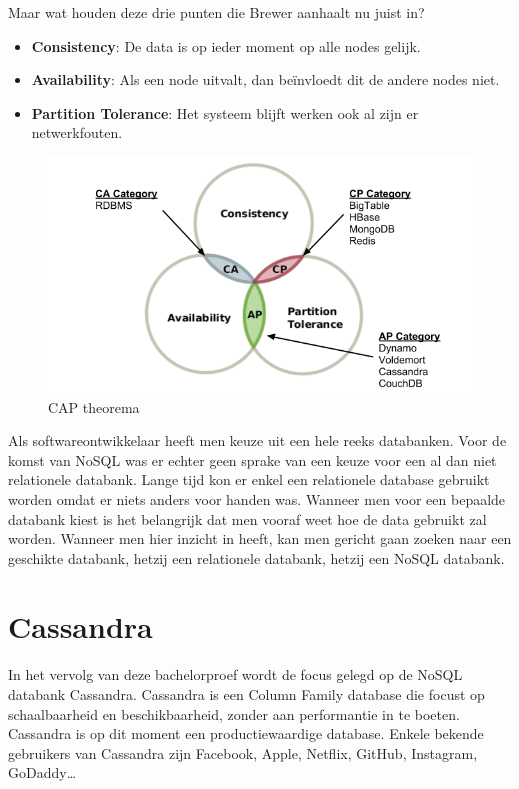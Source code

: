 Maar wat houden deze drie punten die Brewer aanhaalt nu juist in?

\begin{itemize}
	\item \textbf{Consistency}: De data is op ieder moment op alle nodes gelijk.
	\item \textbf{Availability}: Als een node uitvalt, dan beïnvloedt dit de andere nodes niet.
	\item \textbf{Partition Tolerance}: Het systeem blijft werken ook al zijn er netwerkfouten.
\end{itemize}

\begin{figure}[H]
	\centering
	\includegraphics[width=1\textwidth]{img/2_inleiding/cap}
	\caption{CAP theorema \citep{Alvarado2014CAP}}
	\label{fig:cap}
\end{figure}

Als softwareontwikkelaar heeft men keuze uit een hele reeks databanken.
Voor de komst van NoSQL was er echter geen sprake van een keuze voor een al dan niet relationele databank.
Lange tijd kon er enkel een relationele database gebruikt worden omdat er niets anders voor handen was.
Wanneer men voor een bepaalde databank kiest is het belangrijk dat men vooraf weet hoe de data gebruikt zal worden.
Wanneer men hier inzicht in heeft, kan men gericht gaan zoeken naar een geschikte databank, hetzij een relationele databank, hetzij een NoSQL databank.

\section{Cassandra}

In het vervolg van deze bachelorproef wordt de focus gelegd op de NoSQL databank Cassandra.
Cassandra is een Column Family database die focust op schaalbaarheid en beschikbaarheid, zonder aan performantie in te boeten.
Cassandra is op dit moment een productiewaardige database.
Enkele bekende gebruikers van Cassandra zijn Facebook, Apple, Netflix, GitHub, Instagram, GoDaddy\dots

